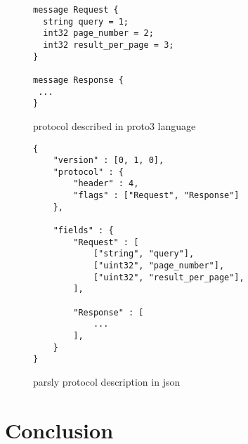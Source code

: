 \documentclass{article}
\begin{document}
\begin{figure}
\begin{center}
\lstset{language=c++}
\begin{lstlisting}
message Request {
  string query = 1;
  int32 page_number = 2;
  int32 result_per_page = 3;
}

message Response {
 ...
}
\end{lstlisting}
\caption{protocol described in proto3 language}
\label{lst:proto3}
\end{center}
\end{figure}


\begin{figure}
\begin{center}
\lstset{language=c++}
\begin{lstlisting}
{
	"version" : [0, 1, 0],
	"protocol" : {
		"header" : 4,
		"flags" : ["Request", "Response"]
	},

	"fields" : {
		"Request" : [
			["string", "query"],
			["uint32", "page_number"],
			["uint32", "result_per_page"],
		],
	
		"Response" : [
			...
		],
	}
}
\end{lstlisting}
\caption{parsly protocol description in json}
\label{lst:parslyJson}
\end{center}
\end{figure}



\section{Conclusion} %
\end{document}
